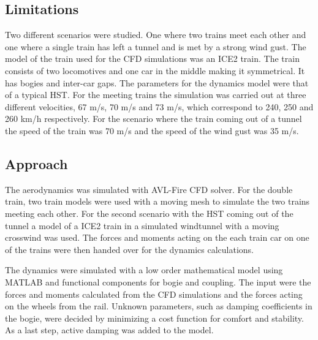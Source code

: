 \subsection{Limitations}
Two different scenarios were studied. One where two trains meet each other and one where a single train has left a tunnel and is met by a strong wind gust. The model of the train used for the CFD simulations was an ICE2 train. The train consists of two locomotives and one car in the middle making it symmetrical. It has bogies and inter-car gaps. The parameters for the dynamics model were that of a typical HST. For the meeting trains the simulation was carried out at three different velocities, 67 m/s, 70 m/s and 73 m/s, which correspond to 240, 250 and 260 km/h respectively. For the scenario where the train coming out of a tunnel the speed of the train was 70 m/s and the speed of the wind gust was 35 m/s.

\subsection{Approach}
The aerodynamics was simulated with AVL-Fire CFD solver. For the double train, two train models were used with a moving mesh to simulate the two trains meeting each other. For the second scenario with the HST coming out of the tunnel a model of a ICE2 train in a simulated windtunnel with a moving crosswind was used. The forces and moments acting on the each train car on one of the trains were then handed over for the dynamics calculations.

The dynamics were simulated with a low order mathematical model using MATLAB and functional components for bogie and coupling.
The input were the forces and moments calculated from the CFD simulations and the forces acting on the wheels from the rail.
Unknown parameters, such as damping coefficients in the bogie, were decided by minimizing a cost function for comfort and stability.
As a last step, active damping was added to the model.